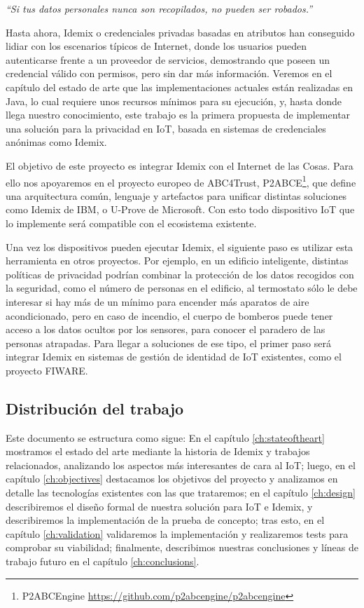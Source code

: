 \begin{center}
	\textit{``Si tus datos personales nunca son recopilados, no pueden ser robados.''}
\end{center}

Hasta ahora, Idemix o credenciales privadas basadas en atributos han conseguido lidiar con los escenarios típicos de Internet, donde los usuarios pueden autenticarse frente a un proveedor de servicios, demostrando que poseen un credencial válido con permisos, pero sin dar más información. Veremos en el capítulo del estado de arte que las implementaciones actuales están realizadas en Java, lo cual requiere unos recursos mínimos para su ejecución, y, hasta donde llega nuestro conocimiento, este trabajo es la primera propuesta de implementar una solución para la privacidad en IoT, basada en sistemas de credenciales anónimas como Idemix.

\hfil

El objetivo de este proyecto es integrar Idemix con el Internet de las Cosas. Para ello nos apoyaremos en el proyecto europeo de ABC4Trust, \ac{P2ABCE}\footnote{P2ABCEngine \url{https://github.com/p2abcengine/p2abcengine}}, que define una arquitectura común, lenguaje y artefactos para unificar distintas soluciones como Idemix de IBM, o U-Prove de Microsoft. Con esto todo dispositivo IoT que lo implemente será compatible con el ecosistema existente.

Una vez los dispositivos pueden ejecutar Idemix, el siguiente paso es utilizar esta herramienta en otros proyectos. Por ejemplo, en un edificio inteligente, distintas políticas de privacidad podrían combinar la protección de los datos recogidos con la seguridad, como el número de personas en el edificio, al termostato sólo le debe interesar si hay más de un mínimo para encender más aparatos de aire acondicionado, pero en caso de incendio, el cuerpo de bomberos puede tener acceso a los datos ocultos por los sensores, para conocer el paradero de las personas atrapadas. Para llegar a soluciones de ese tipo, el primer paso será integrar Idemix en sistemas de gestión de identidad de IoT existentes, como el proyecto FIWARE.

\hfil


\subsection*{Distribución del trabajo}


Este documento se estructura como sigue: En el capítulo \ref{ch:stateoftheart} mostramos el estado del arte mediante la historia de Idemix y trabajos relacionados, analizando los aspectos más interesantes de cara al IoT; luego, en el capítulo \ref{ch:objectives} destacamos los objetivos del proyecto y analizamos en detalle las tecnologías existentes con las que trataremos; en el capítulo \ref{ch:design} describiremos el diseño formal de nuestra solución para IoT e Idemix, y describiremos la implementación de la prueba de concepto; tras esto, en el capítulo \ref{ch:validation} validaremos la implementación y realizaremos tests para comprobar su viabilidad; finalmente, describimos nuestras conclusiones y líneas de trabajo futuro en el capítulo \ref{ch:conclusions}.
